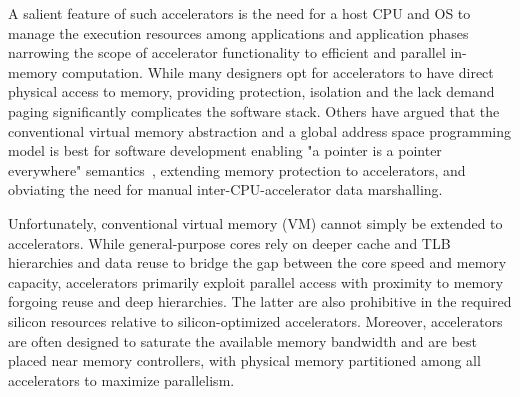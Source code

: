 A salient feature of such accelerators is the need for a host CPU and OS to manage the execution resources among applications and application phases narrowing the scope of accelerator functionality to efficient and parallel in-memory computation. While many designers opt for accelerators to have direct physical access to memory, providing protection, isolation and the lack demand paging significantly complicates the software stack. Others have argued that the conventional virtual memory abstraction and a global address space programming model is best for software development enabling "a pointer is a pointer everywhere" semantics~\cite{pichai:architectural, power:supporting, vesely:observation}, extending memory protection to accelerators, and obviating the need for manual inter-CPU-accelerator data marshalling.



Unfortunately, conventional virtual memory (VM) cannot simply be extended to accelerators. While general-purpose cores rely on deeper cache and TLB hierarchies and data reuse to bridge the gap between the core speed and memory capacity, accelerators primarily exploit parallel access with proximity to memory\cite{} forgoing reuse and deep hierarchies. The latter are also prohibitive in the required silicon resources relative to silicon-optimized accelerators. Moreover, accelerators are often designed to saturate the available memory bandwidth and are best placed near memory controllers, with physical memory partitioned among all accelerators to maximize parallelism\cite{}.


